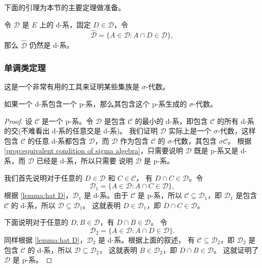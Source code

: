 \documentclass[fontset=none]{Notes}
\begin{document}
下面的引理为本节的主要定理做准备。

\begin{lemma}\label{lemma:hat D}
  令 $\mathcal{D}$ 是 $E$ 上的 d-系，固定 $D\in \mathcal{D}$，令
  \[
    \hat{\mathcal{D}}=\{A\in \mathcal{D}: A\cap D\in \mathcal{D}\},
  \]
  那么 $\hat{\mathcal{D}}$ 仍然是 d-系。
\end{lemma}

\subsubsection{单调类定理}

这是一个非常有用的工具来证明某些集族是 $\sigma$-代数。

\begin{theorem}\label{thm:monotone class theorem}
  如果一个 d-系包含一个 p-系，那么其包含这个 p-系生成的 $\sigma$-代数。
\end{theorem}
\begin{proof}
  设 $\mathcal{C}$ 是一个 p-系。令 $\mathcal{D}$ 是包含 $\mathcal{C}$
  的最小的 d-系，即包含 $\mathcal{C}$ 的所有 d-系的交(不难看出 d-系的任意交是 d-系)。
  我们证明 $\mathcal{D}$ 实际上是一个 $\sigma$-代数，这样包含 $\mathcal{C}$
  的任意 d-系都包含 $\mathcal{D}$，而 $\mathcal{D}$ 作为包含 $\mathcal{C}$
  的 $\sigma$-代数，其包含 $\sigma \mathcal{C}$。
  根据 \autoref{prop:equivalent condition of sigma algebra}，只需要说明 
  $\mathcal{D}$ 既是 p-系又是 d-系，而 $\mathcal{D}$ 已经是 d-系，所以只需要
  说明 $\mathcal{D}$ 是 p-系。

  我们首先说明对于任意的 $D\in \mathcal{D}$ 和 $C\in \mathcal{C}$，
  有 $D\cap C\in \mathcal{D}$。令
  \[
    \mathcal{D}_1=\{A\in \mathcal{D}: A\cap C\in \mathcal{D}\},  
  \]
  根据 \autoref{lemma:hat D}，$\mathcal{D}_1$ 是 d-系。由于 $\mathcal{C}$
  是 p-系，所以 $\mathcal{C}\subseteq \mathcal{D}_1$，即 $\mathcal{D}_1$
  是包含 $\mathcal{C}$ 的 d-系，所以 $\mathcal{D}\subseteq \mathcal{D}_1$。
  这就表明 $D\in \mathcal{D}_1$，即 $D\cap C\in \mathcal{D}$。

  下面说明对于任意的 $D,B\in \mathcal{D}$，有 $D\cap B\in \mathcal{D}$。
  令
  \[
    \mathcal{D}_2=\{A\in \mathcal{D}: A\cap D\in \mathcal{D}\} .
  \]
  同样根据 \autoref{lemma:hat D}，$\mathcal{D}_2$ 是 d-系。根据上面的叙述，
  有 $\mathcal{C}\subseteq \mathcal{D}_2$，即 $\mathcal{D}_2$ 是包含 
  $\mathcal{C}$ 的 d-系，所以 $\mathcal{D}\subseteq \mathcal{D}_2$，
  这就表明 $B\in \mathcal{D}_2$，即 $D\cap B\in \mathcal{D}$。
  这就证明了 $\mathcal{D}$ 是 p-系。
\end{proof}
\end{document}
